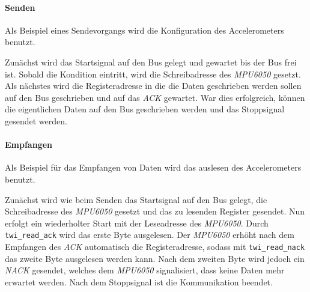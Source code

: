       \paragraph{Senden}
        Als Beispiel eines Sendevorgangs wird die Konfiguration des
        Accelerometers benutzt.
        
        Zunächst wird das Startsignal auf den Bus gelegt und gewartet bis der
        Bus frei ist. Sobald die Kondition eintritt, wird die Schreibadresse des
        \textit{MPU6050} gesetzt. Als nächstes wird die Registeradresse in die
        die Daten geschrieben werden sollen auf den Bus geschrieben und auf das
        \textit{ACK} gewartet. War dies erfolgreich, können die eigentlichen
        Daten auf den Bus geschrieben werden und das Stoppsignal gesendet werden.


      \paragraph{Empfangen}
        Als Beispiel für das Empfangen von Daten wird das auslesen des
        Accelerometers benutzt.
        
        Zunächst wird wie beim Senden das Startsignal auf den Bus gelegt,
        die Schreibadresse des \textit{MPU6050} gesetzt und das zu lesenden
        Register gesendet. Nun erfolgt ein wiederholter Start mit der Leseadresse
        des \textit{MPU6050}. Durch \texttt{twi\_read\_ack} wird das erste Byte
        ausgelesen. Der \textit{MPU6050} erhöht nach dem Empfangen des \textit{ACK}
        automatisch die Registeradresse, sodass mit \texttt{twi\_read\_nack}
        das zweite Byte ausgelesen werden kann. Nach dem zweiten Byte wird
        jedoch ein \textit{NACK} gesendet, welches dem \textit{MPU6050} signalisiert,
        dass keine Daten mehr erwartet werden. Nach dem Stoppsignal ist die
        Kommunikation beendet.


